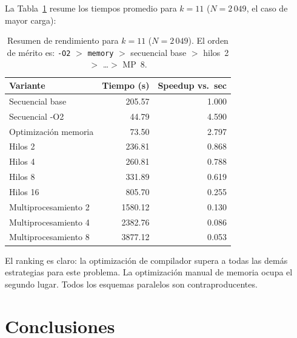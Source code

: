 \documentclass{article}
\begin{document}
La Tabla~\ref{tab:resumen} resume los tiempos promedio para $k=11$ ($N=2\,049$,
el caso de mayor carga):

\begin{table}[H]
\centering
\begin{tabular}{lrr}
\toprule
\textbf{Variante} & \textbf{Tiempo (s)} & \textbf{Speedup vs.\ sec} \\
\midrule
Secuencial base        & 205.57 & 1.000 \\
Secuencial -O2         &  44.79 & 4.590 \\
Optimización memoria   &  73.50 & 2.797 \\
Hilos 2                & 236.81 & 0.868 \\
Hilos 4                & 260.81 & 0.788 \\
Hilos 8                & 331.89 & 0.619 \\
Hilos 16               & 805.70 & 0.255 \\
Multiprocesamiento 2   & 1580.12 & 0.130 \\
Multiprocesamiento 4   & 2382.76 & 0.086 \\
Multiprocesamiento 8   & 3877.12 & 0.053 \\
\bottomrule
\end{tabular}
\caption{Resumen de rendimiento para $k=11$ ($N=2\,049$). El orden de mérito es: \texttt{-O2} $>$ \texttt{memory} $>$ secuencial base $>$ hilos~2 $>$ \ldots $>$ MP~8.}
\label{tab:resumen}
\end{table}

El ranking es claro: la optimización de compilador supera a todas las demás
estrategias para este problema.  La optimización manual de memoria ocupa el
segundo lugar.  Todos los esquemas paralelos son contraproducentes.

\section{Conclusiones}
\end{document}
